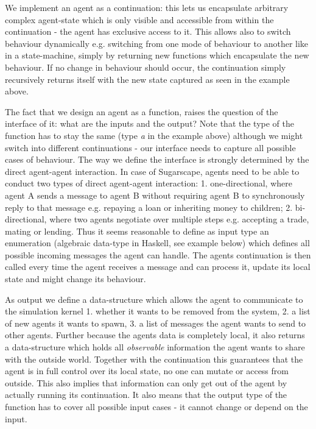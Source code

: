 We implement an agent as a continuation: this lets us encapsulate arbitrary complex agent-state which is only visible and accessible from within the continuation - the agent has exclusive access to it. This allows also to switch behaviour dynamically e.g. switching from one mode of behaviour to another like in a state-machine, simply by returning new functions which encapsulate the new behaviour. If no change in behaviour should occur, the continuation simply recursively returns itself with the new state captured as seen in the example above.

The fact that we design an agent as a function, raises the question of the interface of it: what are the inputs and the output? Note that the type of the function has to stay the same (type \textit{a} in the example above) although we might switch into different continuations - our interface needs to capture all possible cases of behaviour. The way we define the interface is strongly determined by the direct agent-agent interaction. In case of Sugarscape, agents need to be able to conduct two types of direct agent-agent interaction: 1. one-directional, where agent A sends a message to agent B without requiring agent B to synchronously reply to that message e.g. repaying a loan or inheriting money to children; 2. bi-directional, where two agents negotiate over multiple steps e.g. accepting a trade, mating or lending. Thus it seems reasonable to define as input type an enumeration (algebraic data-type in Haskell, see example below) which defines all possible incoming messages the agent can handle. The agents continuation is then called every time the agent receives a message and can process it, update its local state and might change its behaviour.

As output we define a data-structure which allows the agent to communicate to the simulation kernel 1. whether it wants to be removed from the system, 2. a list of new agents it wants to spawn, 3. a list of messages the agent wants to send to other agents. Further because the agents data is completely local, it also returns a data-structure which holds all \textit{observable} information the agent wants to share with the outside world. Together with the continuation this guarantees that the agent is in full control over its local state, no one can mutate or access from outside. This also implies that information can only get out of the agent by actually running its continuation. It also means that the output type of the function has to cover all possible input cases - it cannot change or depend on the input. 

